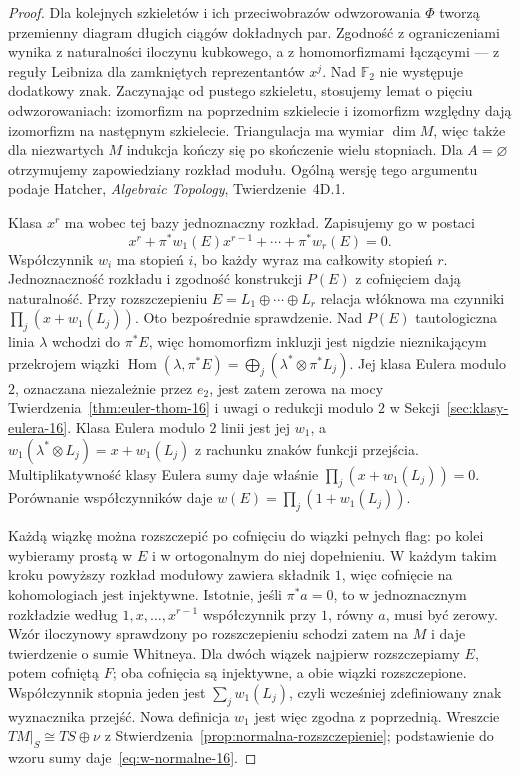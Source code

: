 \begin{proof}
Dla kolejnych szkieletów i ich przeciwobrazów odwzorowania $\Phi$
tworzą przemienny diagram długich ciągów dokładnych par.
Zgodność z ograniczeniami wynika z naturalności iloczynu kubkowego,
a z homomorfizmami łączącymi --- z reguły Leibniza dla zamkniętych
reprezentantów $x^j$. Nad $\mathbb F_2$ nie występuje dodatkowy znak.
Zaczynając od pustego szkieletu, stosujemy lemat o pięciu
odwzorowaniach: izomorfizm na poprzednim szkielecie i izomorfizm
względny dają izomorfizm na następnym szkielecie.
Triangulacja ma wymiar $\dim M$, więc także dla niezwartych $M$
indukcja kończy się po skończenie wielu stopniach. Dla $A=\varnothing$
otrzymujemy zapowiedziany rozkład modułu. Ogólną wersję tego argumentu
podaje Hatcher, \emph{Algebraic Topology}, Twierdzenie~4D.1.

Klasa $x^r$ ma wobec
tej bazy jednoznaczny
rozkład. Zapisujemy
go w postaci
\[
 x^r+
   \pi^*w_1(E)x^{r-1}
     +\cdots+\pi^*w_r(E)=0.
\]
Współczynnik $w_i$
ma stopień $i$,
bo każdy wyraz ma
całkowity stopień $r$.
Jednoznaczność rozkładu
i zgodność konstrukcji
$P(E)$ z cofnięciem
dają naturalność.
Przy rozszczepieniu
$E=L_1\oplus\cdots\oplus L_r$
relacja włóknowa
ma czynniki
$\prod_j(x+w_1(L_j))$.
Oto bezpośrednie
sprawdzenie. Nad $P(E)$
tautologiczna linia
$\lambda$ wchodzi
do $\pi^*E$, więc
homomorfizm inkluzji
jest nigdzie
nieznikającym
przekrojem wiązki
$\operatorname{Hom}(\lambda,\pi^*E)
=\bigoplus_j(\lambda^*\otimes\pi^*L_j)$.
Jej klasa Eulera modulo $2$, oznaczana niezależnie
przez $e_2$, jest zatem zerowa
na mocy
Twierdzenia~\ref{thm:euler-thom-16}
i uwagi o redukcji
modulo $2$ w
Sekcji~\ref{sec:klasy-eulera-16}.
Klasa Eulera modulo $2$
linii jest jej
$w_1$, a
$w_1(\lambda^*\otimes L_j)
=x+w_1(L_j)$
z rachunku znaków
funkcji przejścia.
Multiplikatywność
klasy Eulera sumy
daje właśnie
$\prod_j(x+w_1(L_j))=0$.
Porównanie współczynników
daje
$w(E)=\prod_j(1+w_1(L_j))$.

Każdą wiązkę można
rozszczepić po cofnięciu
do wiązki pełnych flag:
po kolei wybieramy
prostą w $E$ i w
ortogonalnym do niej
dopełnieniu. W każdym
takim kroku powyższy
rozkład modułowy
zawiera składnik $1$,
więc cofnięcie
na kohomologiach
jest injektywne.
Istotnie, jeśli $\pi^*a=0$, to w jednoznacznym rozkładzie
według $1,x,\ldots,x^{r-1}$ współczynnik przy $1$,
równy $a$, musi być zerowy.
Wzór iloczynowy
sprawdzony po
rozszczepieniu
schodzi zatem na $M$
i daje twierdzenie o sumie Whitneya. Dla dwóch
wiązek najpierw rozszczepiamy $E$, potem cofniętą $F$;
oba cofnięcia są injektywne, a obie wiązki rozszczepione.
Współczynnik stopnia jeden jest $\sum_jw_1(L_j)$,
czyli wcześniej zdefiniowany znak wyznacznika przejść.
Nowa definicja $w_1$ jest więc zgodna z poprzednią.
Wreszcie
$TM|_S\cong TS\oplus\nu$
z
Stwierdzenia~\ref{prop:normalna-rozszczepienie};
podstawienie do wzoru
sumy daje~\eqref{eq:w-normalne-16}.
\end{proof}

